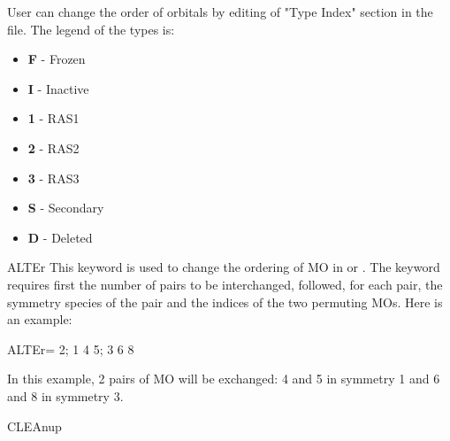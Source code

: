 \begin{keywordlist}
User can change the order of orbitals by editing of "Type Index" section
in the  file. The legend of the types is:
\begin{itemize}
\item{{\bf F}} - Frozen
\item{{\bf I}} - Inactive
\item{{\bf 1}} - RAS1
\item{{\bf 2}} - RAS2
\item{{\bf 3}} - RAS3
\item{{\bf S}} - Secondary
\item{{\bf D}} - Deleted
\end{itemize}
\item[ALTEr]
This keyword is used to change the ordering of MO in  or
. The keyword requires first the number of pairs to be interchanged,
followed, for each pair, the symmetry species of
the pair and the indices of the two permuting MOs. Here is an example:
\begin{inputlisting}
ALTEr= 2; 1 4 5; 3 6 8
\end{inputlisting}
In this example, 2 pairs of MO will be exchanged: 4 and 5 in symmetry 1 and
6 and 8 in symmetry 3.
\item[CLEAnup]

\end{keywordlist}
